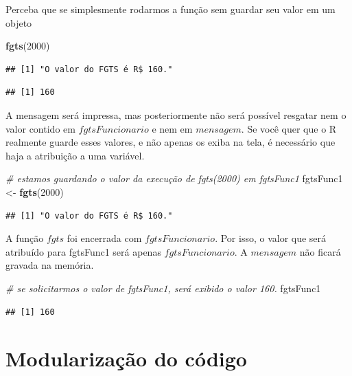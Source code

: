 \documentclass[
]{book}
\newenvironment{Shaded}{\begin{snugshade}}{\end{snugshade}}
\newcommand{\CommentTok}[1]{\textcolor[rgb]{0.56,0.35,0.01}{\textit{#1}}}
\newcommand{\DecValTok}[1]{\textcolor[rgb]{0.00,0.00,0.81}{#1}}
\newcommand{\KeywordTok}[1]{\textcolor[rgb]{0.13,0.29,0.53}{\textbf{#1}}}
\newcommand{\NormalTok}[1]{#1}
\newcommand{\StringTok}[1]{\textcolor[rgb]{0.31,0.60,0.02}{#1}}
\begin{document}
Perceba que se simplesmente rodarmos a função sem guardar seu valor em um objeto

\begin{Shaded}
\begin{Highlighting}[]
\KeywordTok{fgts}\NormalTok{(}\DecValTok{2000}\NormalTok{)}
\end{Highlighting}
\end{Shaded}

\begin{verbatim}
## [1] "O valor do FGTS é R$ 160."
\end{verbatim}

\begin{verbatim}
## [1] 160
\end{verbatim}

A mensagem será impressa, mas posteriormente não será possível resgatar nem o valor contido em \(fgtsFuncionario\) e nem em \(mensagem\). Se você quer que o R realmente guarde esses valores, e não apenas os exiba na tela, é necessário que haja a atribuição a uma variável.

\begin{Shaded}
\begin{Highlighting}[]
\CommentTok{# estamos guardando o valor da execução de fgts(2000) em fgtsFunc1}
\NormalTok{fgtsFunc1 <-}\StringTok{ }\KeywordTok{fgts}\NormalTok{(}\DecValTok{2000}\NormalTok{)}
\end{Highlighting}
\end{Shaded}

\begin{verbatim}
## [1] "O valor do FGTS é R$ 160."
\end{verbatim}

A função \(fgts\) foi encerrada com \(fgtsFuncionario\). Por isso, o valor que será atribuído para fgtsFunc1 será apenas \(fgtsFuncionario\). A \(mensagem\) não ficará gravada na memória.

\begin{Shaded}
\begin{Highlighting}[]
\CommentTok{# se solicitarmos o valor de fgtsFunc1, será exibido o valor 160.}
\NormalTok{fgtsFunc1}
\end{Highlighting}
\end{Shaded}

\begin{verbatim}
## [1] 160
\end{verbatim}

\hypertarget{modularizauxe7uxe3o-do-cuxf3digo}{%
\section{Modularização do código}\label{modularizauxe7uxe3o-do-cuxf3digo}}
\end{document}
